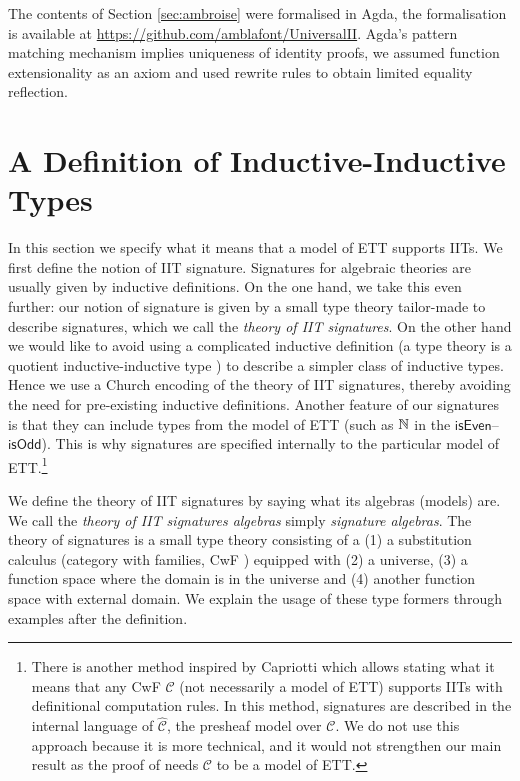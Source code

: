 \documentclass[a4paper,UKenglish,cleveref, autoref]{lipics-v2019}
\begin{document}
The contents of Section \ref{sec:ambroise} were formalised in Agda,
the formalisation is available at
\url{https://github.com/amblafont/UniversalII}. Agda's pattern
matching mechanism implies uniqueness of identity proofs, we assumed
function extensionality as an axiom and used rewrite rules
\cite{cockxsprinkles} to obtain limited equality reflection.


\section{A Definition of Inductive-Inductive Types}
\label{sec:theory_of_signatures}

In this section we specify what it means that a model of ETT supports
IITs. We first define the notion of IIT signature. Signatures for
algebraic theories are usually given by inductive definitions. On the
one hand, we take this even further: our notion of signature is given
by a small type theory tailor-made to describe signatures, which we call
the \emph{theory of IIT signatures}. On the other hand we would
like to avoid using a complicated inductive definition (a type theory
is a quotient inductive-inductive type \cite{ttintt}) to describe a
simpler class of inductive types. Hence we use a Church encoding
\cite{DBLP:conf/lics/AwodeyFS18} of the theory of IIT signatures, thereby
avoiding the need for pre-existing inductive definitions. Another
feature of our signatures is that they can include types from the
model of ETT (such as $\mathbb{N}$ in the
$\mathsf{isEven}$--$\mathsf{isOdd}$). This is why signatures are
specified internally to the particular model of ETT.\footnote{There is
  another method inspired by Capriotti \cite{paolo} which allows
  stating what it means that any CwF $\mathcal{C}$ (not necessarily a
  model of ETT) supports IITs with definitional computation rules. In
  this method, signatures are described in the internal language of
  $\hat{\mathcal{C}}$, the presheaf model over $\mathcal{C}$. We do not
  use this approach because it is more technical, and it would not
  strengthen our main result  as the proof of
   needs $\mathcal{C}$ to be a model of ETT.}

We define the theory of IIT signatures by saying what its algebras
(models) are. We call the \emph{theory of IIT signatures algebras}
simply \emph{signature algebras}. The theory of signatures is a small
type theory consisting of a (1) a substitution calculus (category with
families, CwF \cite{Dybjer96internaltype}) equipped with (2) a
universe, (3) a function space where the domain is in the universe and
(4) another function space with external domain. We explain the usage
of these type formers through examples after the definition.
\end{document}

